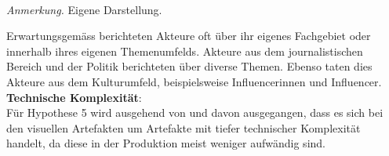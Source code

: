 \documentclass[12pt,a4paper]{article}        %
\begin{document}
\begin{table}
  \centering
  \caption{\textit{Kreuztabelle zwischen Akteurrolle und Beitragsthema}}
  \label{tab:results_role_topic_xtable}
  \\
  \footnotesize\textit{Anmerkung.} Eigene Darstellung.
\end{table}

Erwartungsgemäss berichteten Akteure oft über ihr eigenes Fachgebiet oder innerhalb ihres eigenen Themenumfelds. Akteure aus dem journalistischen Bereich und der Politik berichteten über diverse Themen. Ebenso taten dies Akteure aus dem Kulturumfeld, beispielsweise Influencerinnen und Influencer.\\

\textbf{Technische Komplexität}:\\
Für Hypothese 5 wird ausgehend von \textcite [15]{bradshaw_industrialized_2021} und \textcite[3698]{weikmann_visual_2023} davon ausgegangen, dass es sich bei den visuellen Artefakten um Artefakte mit tiefer technischer Komplexität handelt, da diese in der Produktion meist weniger aufwändig sind.
\end{document}
